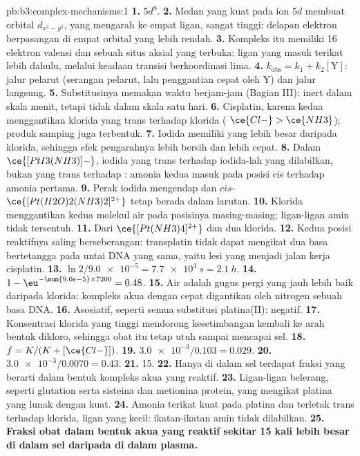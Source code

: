 \begin{solution}{pb:b3:complex-mechanisms:1}
\textbf{1.} $5d^8$.
\textbf{2.} Medan yang kuat pada ion $5d$ membuat orbital $d_{x^2-y^2}$, yang mengarah ke empat
ligan, sangat tinggi: delapan elektron berpasangan di empat orbital yang lebih rendah.
\textbf{3.} Kompleks itu memiliki 16 elektron valensi dan sebuah situs aksial yang terbuka: ligan yang
masuk terikat lebih dahulu, melalui keadaan transisi berkoordinasi lima.
\textbf{4.} $k_{\mathrm{obs}} = k_1 + k_2[\mathrm Y]$: jalur pelarut (serangan pelarut, lalu penggantian cepat oleh Y)
dan jalur langsung.
\textbf{5.} Substitusinya memakan waktu berjam-jam (Bagian III): inert dalam skala menit, tetapi tidak dalam
skala satu hari.
\textbf{6.} Cisplatin, karena  kedua menggantikan klorida yang trans terhadap klorida
( $\ce{Cl-} > \ce{NH3}$); produk samping juga terbentuk.
\textbf{7.} Iodida memiliki  yang lebih besar daripada klorida, sehingga efek pengarahnya
lebih bersih dan lebih cepat.
\textbf{8.} Dalam $\ce{[PtI3(NH3)]-}$, iodida yang trans terhadap iodida-lah yang dilabilkan, bukan yang trans terhadap
: amonia kedua masuk pada posisi cis terhadap amonia pertama.
\textbf{9.} Perak iodida mengendap dan $cis$-$\ce{[Pt(H2O)2(NH3)2]^{2+}}$ tetap berada dalam larutan.
\textbf{10.} Klorida menggantikan kedua molekul air pada posisinya masing-masing; ligan-ligan
amin tidak tersentuh.
\textbf{11.} Dari $\ce{[Pt(NH3)4]^{2+}}$ dan dua klorida.
\textbf{12.} Kedua posisi reaktifnya saling berseberangan: transplatin tidak dapat mengikat dua
basa bertetangga pada untai DNA yang sama, yaitu lesi yang menjadi jalan kerja
cisplatin.
\textbf{13.} $\ln2/\num{9.0e-5} = \qty{7.7e3}{s} = \qty{2.1}{h}$.
\textbf{14.} $1 - \eu^{-\num{9.0e-5} \times 7200} = 0.48$.
\textbf{15.} Air adalah gugus pergi yang jauh lebih baik daripada klorida: kompleks akua
dengan cepat digantikan oleh nitrogen sebuah basa DNA.
\textbf{16.} Asosiatif, seperti semua substitusi platina(II): 
negatif.
\textbf{17.} Konsentrasi klorida yang tinggi mendorong kesetimbangan kembali ke arah
bentuk dikloro, sehingga obat itu tetap utuh sampai mencapai sel.
\textbf{18.} $f = K/(K + [\ce{Cl-}])$.
\textbf{19.} $\num{3.0e-3}/0.103 = 0.029$.
\textbf{20.} $\num{3.0e-3}/0.0070 = 0.43$.
\textbf{21.} 15.
\textbf{22.} Hanya di dalam sel terdapat fraksi yang berarti dalam bentuk kompleks akua
yang reaktif.
\textbf{23.} Ligan-ligan belerang, seperti glutation serta sisteina dan metionina
protein, yang mengikat platina yang lunak dengan kuat.
\textbf{24.} Amonia terikat kuat pada platina dan terletak trans terhadap klorida, ligan yang
 kecil: ikatan-ikatan amin tidak dilabilkan.
\textbf{25.} \textbf{Fraksi obat dalam bentuk akua yang reaktif sekitar 15 kali lebih besar di dalam sel
daripada di dalam plasma.}
\end{solution}
